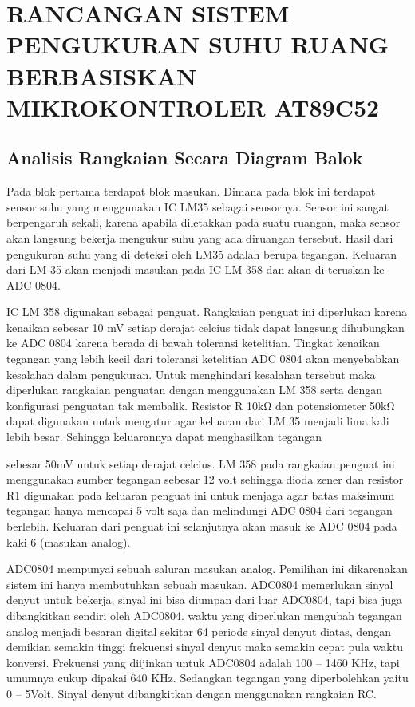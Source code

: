 \documentclass{jtetiproposalskripsi}
\begin{document}
\chapter{RANCANGAN SISTEM PENGUKURAN SUHU RUANG
BERBASISKAN MIKROKONTROLER AT89C52  
}

\section{Analisis Rangkaian Secara Diagram Balok}
Pada blok pertama terdapat blok masukan. Dimana pada blok ini terdapat sensor suhu yang menggunakan IC LM35 sebagai sensornya. Sensor ini sangat berpengaruh sekali, karena apabila diletakkan pada suatu ruangan, maka sensor akan langsung bekerja mengukur suhu yang ada diruangan tersebut. Hasil dari pengukuran suhu yang di deteksi oleh LM35 adalah berupa tegangan. Keluaran dari LM 35 akan menjadi masukan pada IC LM 358 dan akan di teruskan ke ADC 0804.




IC LM 358 digunakan sebagai penguat. Rangkaian penguat ini diperlukan karena kenaikan sebesar 10 mV setiap derajat celcius tidak dapat langsung dihubungkan ke ADC 0804 karena berada di bawah toleransi ketelitian. Tingkat kenaikan tegangan yang lebih kecil dari toleransi ketelitian ADC 0804 akan menyebabkan kesalahan dalam pengukuran. Untuk menghindari kesalahan tersebut maka diperlukan rangkaian penguatan dengan menggunakan LM 358 serta dengan konfigurasi penguatan tak membalik. Resistor R 10kΩ dan potensiometer 50kΩ dapat digunakan untuk mengatur agar keluaran dari LM 35 menjadi lima kali lebih besar. Sehingga keluarannya dapat menghasilkan tegangan




sebesar 50mV untuk setiap derajat celcius.
LM 358 pada rangkaian penguat ini menggunakan sumber tegangan sebesar 12 volt sehingga dioda zener dan resistor R1 digunakan pada keluaran penguat ini untuk menjaga agar batas maksimum tegangan hanya mencapai 5 volt saja dan melindungi ADC 0804 dari tegangan berlebih. Keluaran dari penguat ini selanjutnya akan masuk ke ADC 0804 pada kaki 6 (masukan analog).




ADC0804 mempunyai sebuah saluran masukan analog. Pemilihan ini dikarenakan sistem ini hanya membutuhkan sebuah masukan. ADC0804 memerlukan sinyal denyut untuk bekerja, sinyal ini bisa diumpan dari luar ADC0804, tapi bisa juga dibangkitkan sendiri oleh ADC0804. waktu yang diperlukan mengubah tegangan analog menjadi besaran digital sekitar 64 periode sinyal denyut diatas, dengan demikian semakin tinggi frekuensi sinyal denyut maka semakin cepat pula waktu konversi. Frekuensi yang diijinkan untuk ADC0804 adalah 100 – 1460 KHz, tapi umumnya cukup dipakai 640 KHz. Sedangkan tegangan yang diperbolehkan yaitu 0 – 5Volt. Sinyal denyut dibangkitkan dengan menggunakan rangkaian RC.
\end{document}
